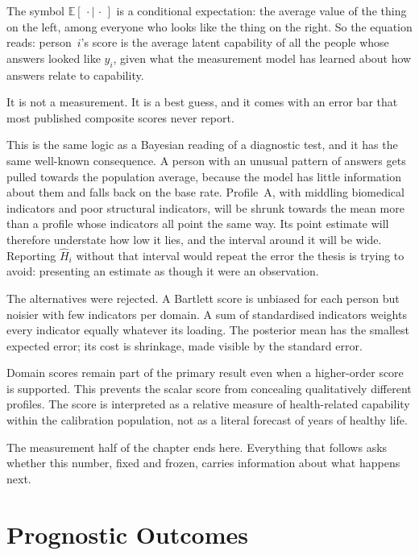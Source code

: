 \begin{reading}
The symbol $\mathbb{E}[\,\cdot\mid\,\cdot\,]$ is a conditional expectation: the
average value of the thing on the left, among everyone who looks like the thing
on the right. So the equation reads: person~$i$'s score is the average latent
capability of all the people whose answers looked like $y_i$, given what the
measurement model has learned about how answers relate to capability.

It is not a measurement. It is a best guess, and it comes with an error bar
that most published composite scores never report.
\end{reading}

This is the same logic as a Bayesian reading of a diagnostic test, and it has
the same well-known consequence. A person with an unusual pattern of answers
gets pulled towards the population average, because the model has little
information about them and falls back on the base rate. Profile~A, with middling
biomedical indicators and poor structural indicators, will be shrunk towards
the mean more than a profile whose indicators all point the same way. Its point
estimate will therefore understate how low it lies, and the interval around it
will be wide. Reporting $\widehat H_i$ without that
interval would repeat the error the thesis is trying to avoid: presenting an
estimate as though it were an observation.

The alternatives were rejected. A Bartlett score is unbiased for each person
but noisier with few indicators per domain. A sum of standardised indicators
weights every indicator equally whatever its loading. The posterior mean has
the smallest expected error; its cost is shrinkage, made visible by the
standard error.

Domain scores remain part of the primary result even when a higher-order score is supported. This prevents the scalar score from concealing qualitatively different profiles. The score is interpreted as a relative measure of health-related capability within the calibration population, not as a literal forecast of years of healthy life.

The measurement half of the chapter ends here. Everything that follows asks whether this number, fixed and frozen, carries information about what happens next.

\section{Prognostic Outcomes}
\label{sec:prognostic}

